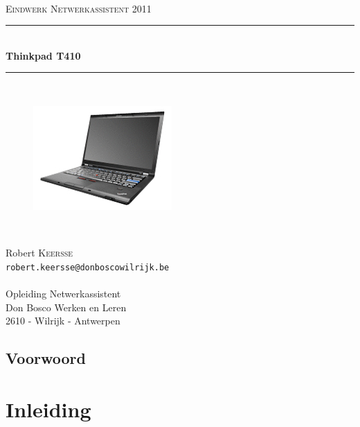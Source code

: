 \documentclass[11pt,twoside,onecolumn,titlepage,openbib]{book}
\newcommand{\HRule}{\rule{\linewidth}{0.5mm}}
\begin{document}
\frontmatter

\begin{titlepage}
\begin{center}
\textsc{\Large }\\[1.5cm]
\textsc{\Large Eindwerk Netwerkassistent 2011}\\[0.5cm]
\HRule \\[0.8cm]
{ \huge \bfseries Thinkpad T410}\\[0.4cm]
\HRule \\[1.5cm]
 \begin{figure}[!t]
    \centering
   \includegraphics[scale=0.7]{01-lenovo-laptop}
 \end{figure}
\textsc{\Large }\\[2.5cm]
\begin{minipage}{0.4\textwidth}
\begin{center}
\large Robert \textsc{Keersse}\\
\texttt{robert.keersse@donboscowilrijk.be}\\
\texttt{ }\\
Opleiding Netwerkassistent\\
Don Bosco Werken en Leren\\
2610 - Wilrijk - Antwerpen
\end{center}
\end{minipage}
\vfill
\end{center}
\end{titlepage}

\tableofcontents
\listoffigures
\newpage
\chapter*{Voorwoord}



\mainmatter
\part{Inleiding}

\end{document}

